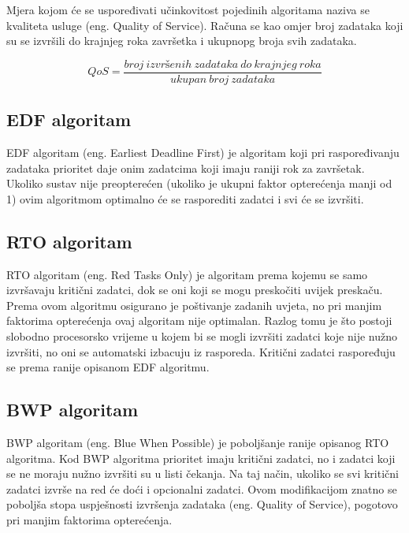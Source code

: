 \documentclass[../zavrsni.tex]{subfiles}
\begin{document}
Mjera kojom će se uspoređivati učinkovitost pojedinih algoritama naziva se kvaliteta usluge (eng. Quality of Service).
Računa se kao omjer broj zadataka koji su se izvršili do krajnjeg roka završetka i ukupnopg broja svih zadataka.

\begin{equation*}
    QoS = \frac{broj\ izvršenih\ zadataka\ do\ krajnjeg\ roka}{ukupan\ broj\ zadataka}
\end{equation*}

\subsection{EDF algoritam}

EDF algoritam (eng. Earliest Deadline First) je algoritam koji pri raspoređivanju zadataka prioritet daje onim zadatcima 
koji imaju raniji rok za završetak. Ukoliko sustav nije preopterećen (ukoliko je ukupni faktor opterećenja manji od 1) 
ovim algoritmom optimalno će se rasporediti zadatci i svi će se izvršiti.

\subsection{RTO algoritam}

RTO algoritam (eng. Red Tasks Only) je algoritam prema kojemu se samo izvršavaju kritični zadatci, 
dok se oni koji se mogu preskočiti uvijek preskaču. Prema ovom algoritmu osigurano je poštivanje zadanih uvjeta, no pri manjim 
faktorima opterećenja ovaj algoritam 
nije optimalan. Razlog tomu je što postoji slobodno procesorsko vrijeme u kojem bi se mogli izvršiti zadatci koje nije nužno izvršiti, no 
oni se automatski izbacuju iz rasporeda. Kritični zadatci raspoređuju se prema ranije opisanom EDF algoritmu. 

\subsection{BWP algoritam}

BWP algoritam (eng. Blue When Possible) je poboljšanje ranije opisanog RTO algoritma. Kod BWP algoritma prioritet imaju kritični zadatci, 
no i zadatci koji se ne moraju nužno izvršiti su u listi čekanja. Na taj način, ukoliko se svi kritični zadatci izvrše na red će doći
i opcionalni zadatci. Ovom modifikacijom znatno se poboljša stopa uspješnosti izvršenja zadataka (eng. Quality of Service), pogotovo pri
 manjim faktorima opterećenja.
\end{document}
